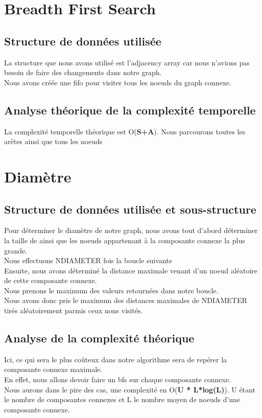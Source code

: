 \documentclass[a4paper,10pt]{report}
\begin{document}
\section{Breadth First Search}
\subsection{Structure de données utilisée}
La structure que nous avons utilisé est l'adjacency array car nous n'avions pas besoin de faire des changements dans notre graph.
\\
Nous avons créée une fifo pour visiter tous les noeuds du graph connexe. 
\subsection{Analyse théorique de la complexité temporelle}
La complexité temporelle théorique est O(\textbf{S+A}). Nous parcourons toutes les arêtes ainsi que tous les noeuds

\section{Diamètre}
\subsection{Structure de données utilisée et sous-structure}
Pour déterminer le diamètre de notre graph, nous avons tout d'abord déterminer la taille de ainsi que les noeuds appartenant à la composante connexe la plus grande.
\\
Nous effectuons NDIAMETER fois la boucle suivante 
\\
Ensuite, nous avons déterminé la distance maximale venant d'un noeud aléatoire de cette composante connexe.
\\
Nous prenons le maximum des valeurs retournées dans notre boucle.
\\
Nous avons donc pris le maximum des distances maximales de NDIAMETER tirés aléatoirement parmis ceux nons visités.
\\
\subsection{Analyse de la complexité théorique}
Ici, ce qui sera le plus coûteux dans notre algorithme sera de repérer la composante connexe maximale. 
\\
\newline
En effet, nous allons devoir faire un bfs sur chaque composante connexe.
\\
Nous aurons dans le pire des cas, une complexité en O(\textbf{U * L*log(L)}).
\newline
U étant le nombre de composantes connexes et L le nombre moyen de noeuds d'une composante connexe.
\end{document}
